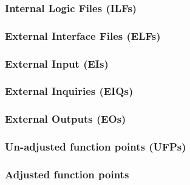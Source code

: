 \subsubsection{Internal Logic Files (ILFs)}

\subsubsection{External Interface Files (ELFs)}

\subsubsection{External Input (EIs)}

\subsubsection{External Inquiries (EIQs)}

\subsubsection{External Outputs (EOs)}

\subsubsection{Un-adjusted function points (UFPs)}

\subsubsection{Adjusted function points}